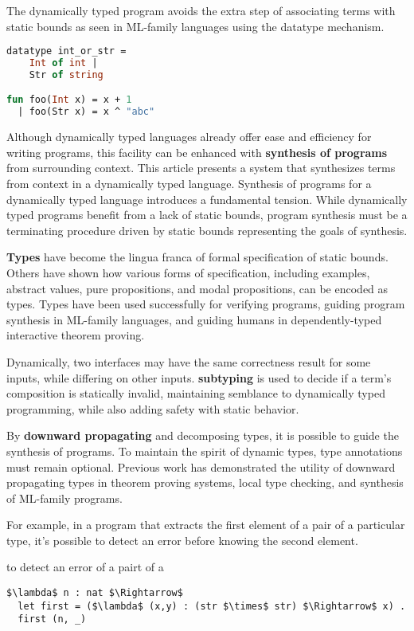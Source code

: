 \documentclass[sigplan,screen]{acmart}
\begin{document}
\noindent The dynamically typed program avoids the extra step of associating terms with
static bounds as seen in ML-family languages using the datatype mechanism. 

\begin{lstlisting}[language=ML]
datatype int_or_str = 
    Int of int | 
    Str of string

fun foo(Int x) = x + 1
  | foo(Str x) = x ^ "abc"
\end{lstlisting}


Although dynamically typed languages already offer ease and efficiency for writing programs, 
this facility can be enhanced with \textbf{synthesis of programs} 
from surrounding context. 
This article presents a system that synthesizes terms from context 
in a dynamically typed language.
Synthesis of programs for a dynamically typed language introduces a fundamental tension. 
While dynamically typed programs benefit from a lack of static bounds, program synthesis
must be a terminating procedure driven by static bounds representing the goals of synthesis.   

\textbf{Types} have become the lingua franca of formal specification of static bounds.
Others have shown how various forms of specification, including examples, abstract values, 
pure propositions, and modal propositions, can be encoded as types.
Types have been used successfully for verifying programs, 
guiding program synthesis in ML-family languages, 
and guiding humans in dependently-typed interactive theorem proving. 

Dynamically, two interfaces may have the same correctness result for some inputs,
while differing on other inputs. \textbf{subtyping} is used to decide if a term's 
composition is statically invalid, maintaining semblance to dynamically typed programming,
while also adding safety with static behavior.

By \textbf{downward propagating} and decomposing types, 
it is possible to guide the synthesis of programs.
To maintain the spirit of dynamic types, type annotations must remain optional.
Previous work has demonstrated the utility of downward propagating types 
in theorem proving systems, local type checking, 
and synthesis of ML-family programs.

For example, in a program that extracts 
the first element of a pair of a particular type, 
it's possible to detect an error before knowing the second element.

to detect an error of a pairt of a   
\begin{lstlisting}
$\lambda$ n : nat $\Rightarrow$
  let first = ($\lambda$ (x,y) : (str $\times$ str) $\Rightarrow$ x) .
  first (n, _) 
\end{lstlisting}
\end{document}
